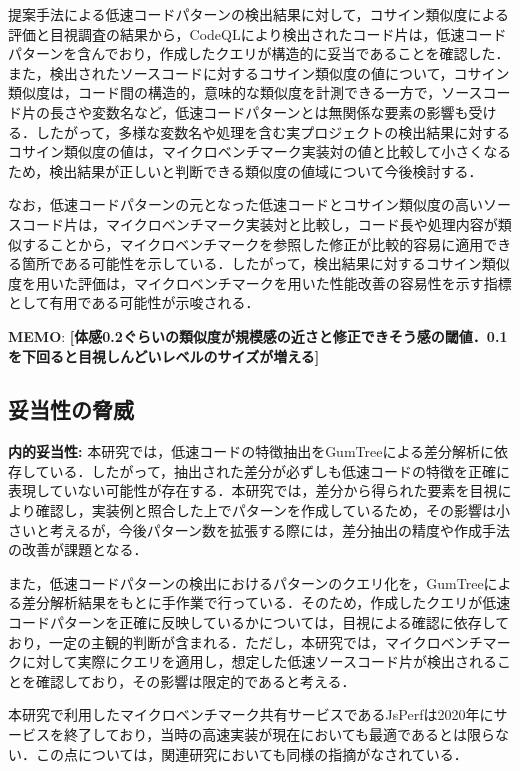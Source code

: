 \documentclass[submit,techrep,noauthor]{ipsj}
\newcommand{\memo}[1]{\colorbox{magenta!30}{{\bf MEMO}:}{\color{red!50} {\textbf{[#1]}}}}
\begin{document}
提案手法による低速コードパターンの検出結果に対して，コサイン類似度による評価と目視調査の結果から，CodeQLにより検出されたコード片は，低速コードパターンを含んでおり，作成したクエリが構造的に妥当であることを確認した．
また，検出されたソースコードに対するコサイン類似度の値について，コサイン類似度は，コード間の構造的，意味的な類似度を計測できる一方で，ソースコード片の長さや変数名など，低速コードパターンとは無関係な要素の影響も受ける．したがって，多様な変数名や処理を含む実プロジェクトの検出結果に対するコサイン類似度の値は，マイクロベンチマーク実装対の値と比較して小さくなるため，検出結果が正しいと判断できる類似度の値域について今後検討する．

なお，低速コードパターンの元となった低速コードとコサイン類似度の高いソースコード片は，マイクロベンチマーク実装対と比較し，コード長や処理内容が類似することから，マイクロベンチマークを参照した修正が比較的容易に適用できる箇所である可能性を示している．したがって，検出結果に対するコサイン類似度を用いた評価は，マイクロベンチマークを用いた性能改善の容易性を示す指標として有用である可能性が示唆される．

\memo{体感0.2ぐらいの類似度が規模感の近さと修正できそう感の閾値．0.1を下回ると目視しんどいレベルのサイズが増える}


\subsection{妥当性の脅威}

\noindent\textbf{内的妥当性: }
本研究では，低速コードの特徴抽出をGumTreeによる差分解析に依存している．したがって，抽出された差分が必ずしも低速コードの特徴を正確に表現していない可能性が存在する．本研究では，差分から得られた要素を目視により確認し，実装例と照合した上でパターンを作成しているため，その影響は小さいと考えるが，今後パターン数を拡張する際には，差分抽出の精度や作成手法の改善が課題となる．

また，低速コードパターンの検出におけるパターンのクエリ化を，GumTreeによる差分解析結果をもとに手作業で行っている．そのため，作成したクエリが低速コードパターンを正確に反映しているかについては，目視による確認に依存しており，一定の主観的判断が含まれる．ただし，本研究では，マイクロベンチマークに対して実際にクエリを適用し，想定した低速ソースコード片が検出されることを確認しており，その影響は限定的であると考える．

本研究で利用したマイクロベンチマーク共有サービスであるJsPerfは2020年にサービスを終了しており，当時の高速実装が現在においても最適であるとは限らない．この点については，関連研究\cite{omori}においても同様の指摘がなされている．
\end{document}
